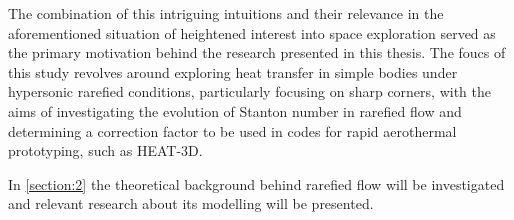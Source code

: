 The combination of this intriguing intuitions and their relevance in the aforementioned situation of heightened interest into space exploration served as the primary motivation behind the research presented in this thesis. The foucs of this study revolves around exploring heat transfer in simple bodies under hypersonic rarefied conditions, particularly focusing on sharp corners, with the aims of investigating the evolution of Stanton number in rarefied flow and determining a correction factor to be used in codes for rapid aerothermal prototyping, such as HEAT-3D.

In \autoref{section:2} the theoretical background behind rarefied flow will be investigated and relevant research about its modelling will be presented.

